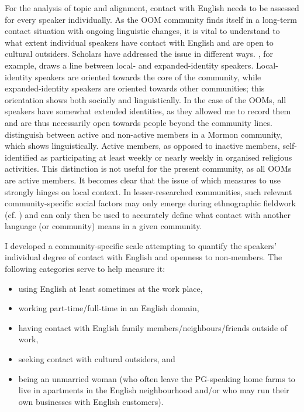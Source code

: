 \documentclass[output=paper]{langscibook}
\begin{document}
For the analysis of topic and alignment, contact with English needs to be assessed for every speaker individually. As the \gls*{OOM} community finds itself in a long-term contact situation with ongoing linguistic changes, it is vital to understand to what extent individual speakers have contact with English and are open to cultural outsiders. Scholars have addressed the issue in different ways. \citet[150–151]{hazen_identity_2000}, for example, draws a line between local- and expanded-identity speakers. Local-identity speakers are oriented towards the core of the community, while expanded-identity speakers are oriented towards other communities; this orientation shows both socially and linguistically. In the case of the \glspl*{OOM}, all speakers have somewhat extended identities, as they allowed me to record them and are thus necessarily open towards people beyond the community lines. \citet{baker-smemoe_linguistic_2015} distinguish between active and non-active members in a Mormon community, which shows linguistically. Active members, as opposed to inactive members, self-identified as participating at least weekly or nearly weekly in organised religious activities. This distinction is not useful for the present community, as all \glspl*{OOM} are active members. It becomes clear that the issue of which measures to use strongly hinges on local context. In lesser-researched communities, such relevant community-specific social factors may only emerge during ethnographic fieldwork (cf. \citealt{stanford_clan_2009,neuhausen_understanding_2023}) and can only then be used to accurately define what contact with another language (or community) means in a given community. 

I developed a community-specific scale attempting to quantify the speakers’ individual degree of contact with English and openness to non-members. The following categories serve to help measure it:
\begin{itemize}
    \item using English at least sometimes at the work place,
    \item working part-time/full-time in an English domain,
    \item having contact with English family members/neighbours/friends outside of work,
    \item seeking contact with cultural outsiders, and
    \item being an unmarried woman (who often leave the \gls*{PG}-speaking home farms to live in apartments in the English neighbourhood and/or who may run their own businesses with English customers).
\end{itemize}
\end{document}
